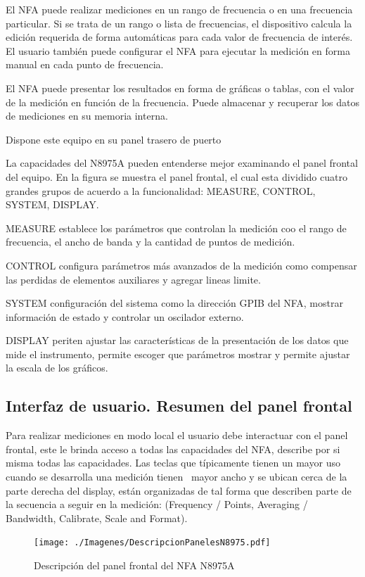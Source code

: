 {	El NFA puede realizar mediciones en un rango de frecuencia o en una frecuencia particular. Si se trata de un rango o	lista de frecuencias, el dispositivo calcula la edición requerida de forma automáticas para cada valor de frecuencia de interés. El usuario también puede configurar el NFA para ejecutar la medición en forma manual en cada punto de frecuencia. 
	
	El NFA puede presentar los resultados en forma de gráficas o tablas, con el valor de la medición en función de la frecuencia. Puede almacenar y recuperar los datos de mediciones en su memoria interna.
	
	Dispone este equipo en su panel trasero de puerto 
	
	La capacidades del N8975A pueden entenderse mejor examinando el panel frontal del equipo. En la figura se muestra el panel frontal, el cual esta dividido cuatro grandes grupos de acuerdo a la funcionalidad: MEASURE, CONTROL, SYSTEM, DISPLAY.
	
	MEASURE establece los parámetros que controlan la medición coo el rango de frecuencia, el ancho de banda y la cantidad	de puntos de medición.
	
	CONTROL configura parámetros más avanzados de la medición como compensar las perdidas de elementos auxiliares y agregar lineas limite.
	
	SYSTEM configuración del sistema como la dirección GPIB del NFA, mostrar información de estado y controlar un oscilador externo.
	
	DISPLAY periten ajustar las características de la presentación de los datos que mide el instrumento, permite escoger que	parámetros mostrar y permite ajustar la escala de los gráficos.
			

	\clearpage
	\subsection{Interfaz de usuario. Resumen del panel frontal}
	Para realizar mediciones en modo local el usuario debe interactuar con el panel frontal, este le brinda acceso a todas las capacidades del NFA, describe por si misma todas las capacidades. Las teclas que típicamente tienen un mayor uso cuando se desarrolla una medición tienen \ mayor ancho y se ubican cerca de la parte derecha del display, están organizadas de tal forma que describen parte de la secuencia a seguir en la medición: (Frequency / Points, Averaging	/ Bandwidth, Calibrate, Scale and Format).
	
	\begin{figure}[ht]
		\centering
		\texttt{[image: ./Imagenes/DescripcionPanelesN8975.pdf]}
		\caption{Descripción del panel frontal del NFA N8975A}
		\label{Fig:DescripcionPanelesN8975}	
	\end{figure}
	
}
